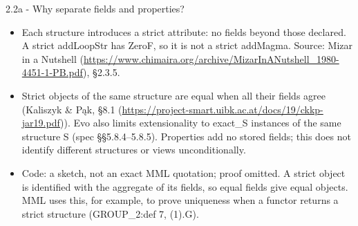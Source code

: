 \documentclass[aspectratio=169,11pt]{beamer}
\begin{document}
\begin{frame}[fragile,t]{2.2a - Why separate fields and properties?}
{\begin{itemize}
\setlength{\parsep}{0pt}
\setlength{\parskip}{0pt}
\item Each structure introduces a strict attribute: no fields beyond those declared. A strict addLoopStr has ZeroF, so it is not a strict addMagma. Source: Mizar in a Nutshell (\url{https://www.chimaira.org/archive/MizarInANutshell\_1980-4451-1-PB.pdf}), §2.3.5.
\item Strict objects of the same structure are equal when all their fields agree (Kaliszyk \& P\k{a}k, §8.1 (\url{https://project-smart.uibk.ac.at/docs/19/ckkp-jar19.pdf})). Evo also limits extensionality to exact\_S instances of the same structure S (spec §§5.8.4–5.8.5). Properties add no stored fields; this does not identify different structures or views unconditionally.
\item Code: a sketch, not an exact MML quotation; proof omitted. A strict object is identified with the aggregate of its fields, so equal fields give equal objects. MML uses this, for example, to prove uniqueness when a functor returns a strict structure (GROUP\_2:def 7, (1).G).
\end{itemize}
}
\end{frame}
\end{document}
